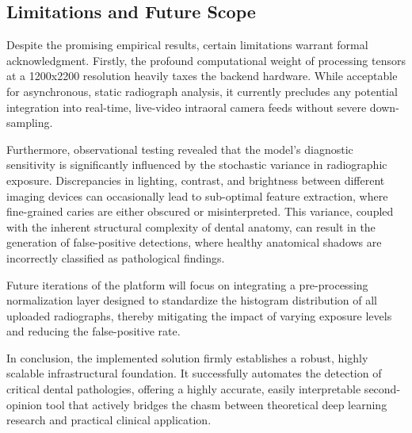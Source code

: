 \subsection{Limitations and Future Scope}
\par Despite the promising empirical results, certain limitations warrant formal acknowledgment. Firstly, the profound computational weight of processing tensors at a 1200x2200 resolution heavily taxes the backend hardware. While acceptable for asynchronous, static radiograph analysis, it currently precludes any potential integration into real-time, live-video intraoral camera feeds without severe down-sampling. 

\par Furthermore, observational testing revealed that the model's diagnostic sensitivity is significantly influenced by the stochastic variance in radiographic exposure. Discrepancies in lighting, contrast, and brightness between different imaging devices can occasionally lead to sub-optimal feature extraction, where fine-grained caries are either obscured or misinterpreted. This variance, coupled with the inherent structural complexity of dental anatomy, can result in the generation of false-positive detections, where healthy anatomical shadows are incorrectly classified as pathological findings.

\par Future iterations of the platform will focus on integrating a pre-processing normalization layer designed to standardize the histogram distribution of all uploaded radiographs, thereby mitigating the impact of varying exposure levels and reducing the false-positive rate.
\par In conclusion, the implemented solution firmly establishes a robust, highly scalable infrastructural foundation. It successfully automates the detection of critical dental pathologies, offering a highly accurate, easily interpretable second-opinion tool that actively bridges the chasm between theoretical deep learning research and practical clinical application.